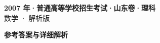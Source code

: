 \documentclass[zihao=-4, a4paper]{ctexart}
\begin{document}
\begin{center}
  {\Large\bfseries 2007 年·普通高等学校招生考试·山东卷·理科}\\[4pt]
  {\large 数学 · 解析版}
\end{center}
\medskip
{}

\clearpage
{}
\begin{center}{\Large\bfseries 参考答案与详细解析}\end{center}
\medskip

\end{document}
